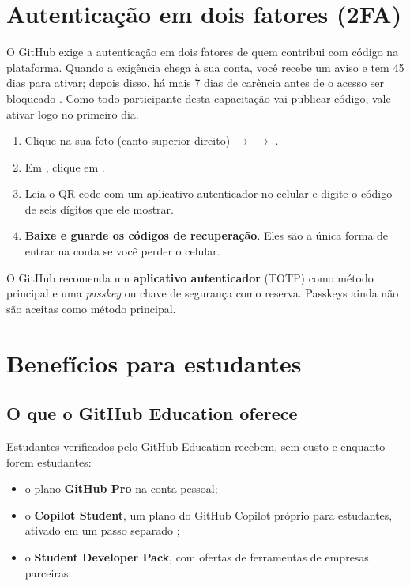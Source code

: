 \section{Autenticação em dois fatores (2FA)}

O GitHub exige a autenticação em dois fatores de quem contribui com código na
plataforma. Quando a exigência chega à sua conta, você recebe um aviso e tem
45 dias para ativar; depois disso, há mais 7 dias de carência antes de o
acesso ser bloqueado \cite{github_2fa}. Como todo participante desta
capacitação vai publicar código, vale ativar logo no primeiro dia.

\begin{enumerate}
  \item Clique na sua foto (canto superior direito) \(\rightarrow\)
         \(\rightarrow\) .
  \item Em , clique em
        .
  \item Leia o QR code com um aplicativo autenticador no celular e digite o
        código de seis dígitos que ele mostrar.
  \item \textbf{Baixe e guarde os códigos de recuperação}. Eles são a única
        forma de entrar na conta se você perder o celular.
\end{enumerate}

\begin{dica}
O GitHub recomenda um \textbf{aplicativo autenticador} (TOTP) como método
principal e uma \emph{passkey} ou chave de segurança como reserva. Passkeys
ainda não são aceitas como método principal.
\end{dica}

\section{Benefícios para estudantes}

\subsection{O que o GitHub Education oferece}

Estudantes verificados pelo GitHub Education recebem, sem custo e enquanto
forem estudantes:

\begin{itemize}
  \item o plano \textbf{GitHub Pro} na conta pessoal;
  \item o \textbf{Copilot Student}, um plano do GitHub Copilot próprio para
        estudantes, ativado em um passo separado \cite{github_copilot_student};
  \item o \textbf{Student Developer Pack}, com ofertas de ferramentas de
        empresas parceiras.
\end{itemize}

